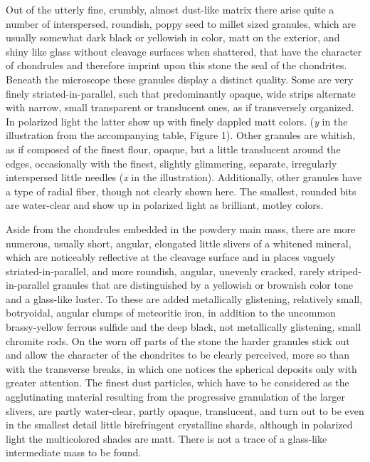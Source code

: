 \documentclass[a4paper, 12pt, oneside]{article}
\begin{document}
Out of the utterly fine, crumbly, almost dust-like matrix there arise quite a number of interspersed, roundish, poppy seed to millet sized granules, which are usually somewhat dark black or yellowish in color, matt on the exterior, and shiny like glass without cleavage surfaces when shattered, that have the character of chondrules and therefore imprint upon this stone the seal of the chondrites. Beneath the microscope these granules display a distinct quality. Some are very finely striated-in-parallel, such that predominantly opaque, wide strips alternate with narrow, small transparent or translucent ones, as if transversely organized. In polarized light the latter show up with finely dappled matt colors. (\emph{y} in the illustration from the accompanying table, Figure 1). Other granules are whitish, as if composed of the finest flour, opaque, but a little translucent around the edges, occasionally with the finest, slightly glimmering, separate, irregularly interspersed little needles (\emph{x} in the illustration).  Additionally, other granules have a type of radial fiber, though not clearly shown here. The smallest, rounded bits are water-clear and show up in polarized light as brilliant, motley colors.

Aside from the chondrules embedded in the powdery main mass, there are more numerous, usually short, angular, elongated little slivers of a whitened mineral, which are noticeably reflective at the cleavage surface and in places vaguely striated-in-parallel, and more roundish, angular, unevenly cracked, rarely striped-in-parallel granules that are distinguished by a yellowish or brownish color tone and a glass-like luster. To these are added metallically glistening, relatively small, botryoidal, angular clumps of meteoritic iron, in addition to the uncommon brassy-yellow ferrous sulfide and the deep black, not metallically glistening, small chromite rods. On the worn off parts of the stone the harder granules stick out and allow the character of the chondrites to be clearly perceived, more so than with the transverse breaks, in which one notices the spherical deposits only with greater attention. The finest dust particles, which have to be considered as the agglutinating material resulting from the progressive granulation of the larger slivers, are partly water-clear, partly opaque, translucent, and turn out to be even in the smallest detail little birefringent crystalline shards, although in polarized light the multicolored shades are matt. There is not a trace of a glass-like intermediate mass to be found.
\end{document}
